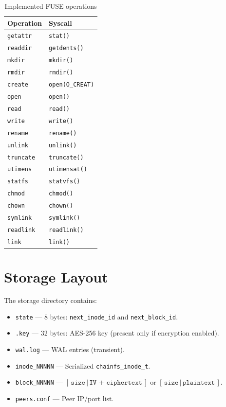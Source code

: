 \documentclass[10pt,twocolumn]{article}
\begin{document}
\begin{table}[H]
\centering
\scriptsize
\begin{tabular}{ll}
\toprule
\textbf{Operation} & \textbf{Syscall} \\
\midrule
\texttt{getattr}  & \texttt{stat()} \\
\texttt{readdir}  & \texttt{getdents()} \\
\texttt{mkdir}    & \texttt{mkdir()} \\
\texttt{rmdir}    & \texttt{rmdir()} \\
\texttt{create}   & \texttt{open(O\_CREAT)} \\
\texttt{open}     & \texttt{open()} \\
\texttt{read}     & \texttt{read()} \\
\texttt{write}    & \texttt{write()} \\
\texttt{rename}   & \texttt{rename()} \\
\texttt{unlink}   & \texttt{unlink()} \\
\texttt{truncate} & \texttt{truncate()} \\
\texttt{utimens}  & \texttt{utimensat()} \\
\texttt{statfs}   & \texttt{statvfs()} \\
\texttt{chmod}    & \texttt{chmod()} \\
\texttt{chown}    & \texttt{chown()} \\
\texttt{symlink}  & \texttt{symlink()} \\
\texttt{readlink} & \texttt{readlink()} \\
\texttt{link}     & \texttt{link()} \\
\bottomrule
\end{tabular}
\caption{Implemented FUSE operations}
\end{table}

\section{Storage Layout}

The storage directory contains:

\begin{itemize}[leftmargin=*]
    \item \texttt{state} —
    8 bytes: \texttt{next\_inode\_id}
    and \texttt{next\_block\_id}.
    \item \texttt{.key} —
    32 bytes: AES-256 key
    (present only if encryption enabled).
    \item \texttt{wal.log} —
    WAL entries (transient).
    \item \texttt{inode\_NNNNN} —
    Serialized \texttt{chainfs\_inode\_t}.
    \item \texttt{block\_NNNNN} —
    $[\,\texttt{size}\,|\,
    \texttt{IV + ciphertext}\,]$
    or $[\,\texttt{size}\,|\,
    \texttt{plaintext}\,]$.
    \item \texttt{peers.conf} —
    Peer IP/port list.
\end{itemize}
\end{document}
